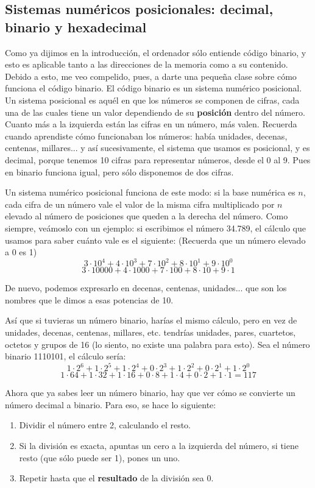 \documentclass[a4paper]{article}
\begin{document}
\subsection{Sistemas numéricos posicionales: decimal, binario y hexadecimal}
\label{numericSystems}
Como ya dijimos en la introducción, el ordenador sólo entiende código binario,
y esto es aplicable tanto a las direcciones de la memoria como a su contenido.
Debido a esto, me veo compelido, pues, a
darte una pequeña clase sobre cómo funciona el código binario. El código binario
es un sistema numérico posicional. Un sistema posicional es aquél en que los
números se componen de cifras, cada una de las cuales tiene un valor dependiendo
de su \textbf{posición} dentro del número. Cuanto más a la izquierda están las
cifras en un número, más valen. Recuerda cuando aprendiste cómo funcionaban los
números: había unidades, decenas, centenas, millares... y así sucesivamente,
el sistema que usamos es posicional, y es decimal, porque tenemos 10 cifras para
representar números, desde el 0 al 9. Pues en binario funciona igual, pero sólo
disponemos de dos cifras.

Un sistema numérico posicional
funciona de este modo: si la base numérica es $n$, cada cifra de un número vale
el valor de la misma cifra multiplicado por $n$ elevado al número de posiciones
que queden a la derecha del número. Como siempre, veámoslo con un ejemplo: si
escribimos el número 34.789, el cálculo que usamos para saber cuánto vale es
el siguiente:
(Recuerda que un número elevado a 0 es 1)
$$
3\cdot10^4+4\cdot10^3+7\cdot10^2+8\cdot10^1+9\cdot10^0
$$
$$
3\cdot10000+4\cdot1000+7\cdot100+8\cdot10+9\cdot1
$$

De nuevo, podemos expresarlo en decenas, centenas, unidades... que son los
nombres que le dimos a esas potencias de 10.

Así que si tuvieras un número binario, harías el mismo cálculo, pero
en vez de unidades, decenas, centenas, millares, etc. tendrías unidades, pares,
cuartetos, octetos y grupos de 16 (lo siento, no existe una palabra para esto).
Sea el número binario 1110101, el cálculo sería:
$$
1\cdot2^6+ 1\cdot2^5+1\cdot2^4+0\cdot2^3+1\cdot2^2+0\cdot2^1+1\cdot2^0
$$
$$
1\cdot64+ 1\cdot32+1\cdot16+0\cdot8+1\cdot4+0\cdot2+1\cdot1=117
$$

Ahora que ya sabes leer un número binario, hay que ver cómo se convierte un
número decimal a binario. Para eso, se hace lo siguiente:
\begin{enumerate}
\item Dividir el número entre 2, calculando el resto.
\item Si la división es exacta, apuntas un cero a la izquierda del número, si
tiene resto (que sólo puede ser 1), pones un uno.
\item Repetir hasta que el \textbf{resultado} de la división sea 0.
\end{enumerate}
\end{document}
